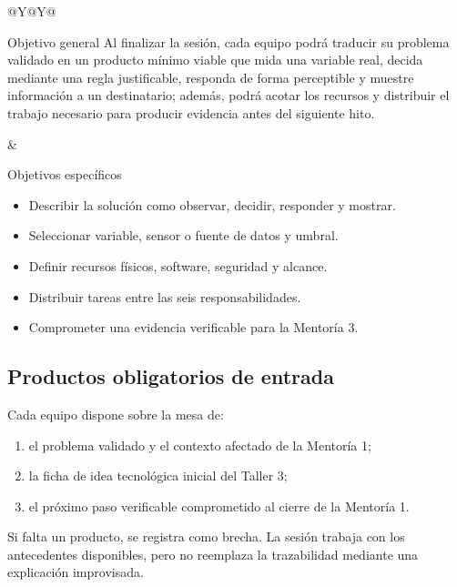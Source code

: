 \documentclass[10pt,a4paper]{article}
\begin{document}
\begin{tabularx}{\textwidth}{@{}Y@{\hspace{5mm}}Y@{}}
\begin{docbox}[height=67mm]{Objetivo general}
Al finalizar la sesión, cada equipo podrá traducir su problema validado en un producto mínimo viable que mida una variable real, decida mediante una regla justificable, responda de forma perceptible y muestre información a un destinatario; además, podrá acotar los recursos y distribuir el trabajo necesario para producir evidencia antes del siguiente hito.
\end{docbox}
&
\begin{docbox}[height=67mm]{Objetivos específicos}
\begin{itemize}
  \item Describir la solución como observar, decidir, responder y mostrar.
  \item Seleccionar variable, sensor o fuente de datos y umbral.
  \item Definir recursos físicos, software, seguridad y alcance.
  \item Distribuir tareas entre las seis responsabilidades.
  \item Comprometer una evidencia verificable para la Mentoría 3.
\end{itemize}
\end{docbox}
\end{tabularx}

\subsection{Productos obligatorios de entrada}
Cada equipo dispone sobre la mesa de:
\begin{enumerate}
  \item el problema validado y el contexto afectado de la Mentoría 1;
  \item la ficha de idea tecnológica inicial del Taller 3;
  \item el próximo paso verificable comprometido al cierre de la Mentoría 1.
\end{enumerate}

Si falta un producto, se registra como brecha. La sesión trabaja con los antecedentes disponibles, pero no reemplaza la trazabilidad mediante una explicación improvisada.
\end{document}
